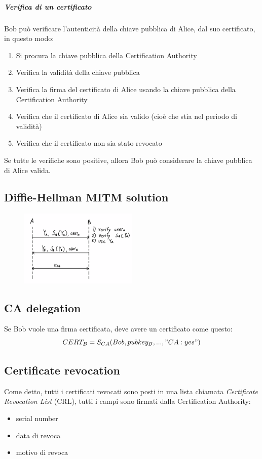 \documentclass[a4paper,12pt]{article}
\begin{document}
\subparagraph{Verifica di un certificato} Bob può verificare l'autenticità della chiave pubblica di Alice, dal suo certificato, in questo modo:
\begin{enumerate}
	\item Si procura la chiave pubblica della Certification Authority
	\item Verifica la validità della chiave pubblica
	\item Verifica la firma del certificato di Alice usando la chiave pubblica della Certification Authority
	\item Verifica che il certificato di Alice sia valido (cioè che stia nel periodo di validità)
	\item Verifica che il certificato non sia stato revocato
\end{enumerate}
Se tutte le verifiche sono positive, allora Bob può considerare la chiave pubblica di Alice valida.

\subsection{Diffie-Hellman MITM solution}
\begin{figure}[H]
  \centering
  \includegraphics[width=0.5\textwidth]{img/dh-cert}
\end{figure}

\subsection{CA delegation}
Se Bob vuole una firma certificata, deve avere un certificato come questo:
$$ CERT_B = S_{CA}(Bob, pubkey_B, ..., "CA:yes")$$

\subsection{Certificate revocation}
Come detto, tutti i certificati revocati sono posti in una lista chiamata \textit{Certificate Revocation List} (CRL), tutti i campi sono firmati dalla Certification Authority:
\begin{itemize}
	\item serial number
	\item data di revoca
	\item motivo di revoca
\end{itemize}
\end{document}
